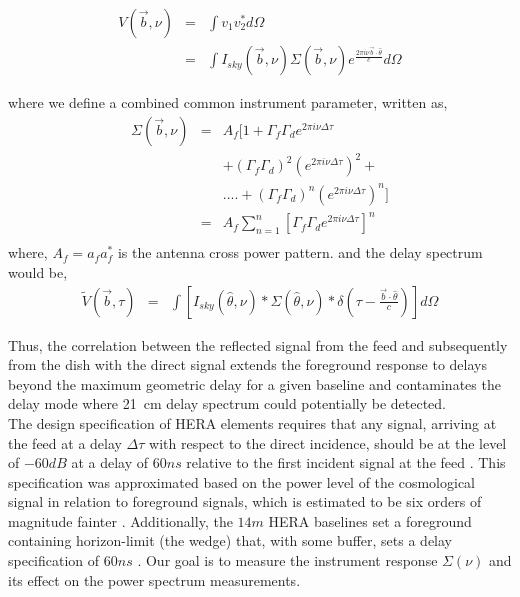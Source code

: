 \documentclass[twocolumn]{emulateapj}
\newcommand{\volt}{{v}}
\newcommand{\vis}{{V}}
\newcommand{\bmvolt}{{a}}
\newcommand{\beam}{{A}}
\newcommand{\thhat}{{\hat\theta}}
\newcommand{\fngexp}{{e^{\frac{2\pi i\nu\vec{b}\cdot\thhat}{c}}}}
\newcommand{\dfngexp}{{e^{2\pi i\nu \Delta \tau}}}
\begin{document}
\begin{eqnarray}\label{eqn:series1}
\vis(\vec b, \nu) & = & \int \volt_{1}\volt_{2}^{*} d\Omega \nonumber\\
			& = & \int I_{sky}(\vec b, \nu)\Sigma(\vec b, \nu) \fngexp d\Omega
\end{eqnarray}

where we define a combined common instrument parameter, written as, 
 \begin{eqnarray}
\Sigma(\vec b, \nu) & = & \beam_{f}  [ 1+  \Gamma_{f}\Gamma_{d} \dfngexp \nonumber\\
&& + (\Gamma_{f}\Gamma_{d})^2(\dfngexp)^{2}+ \nonumber\\
&&  ....+(\Gamma_{f}\Gamma_{d})^{n}(\dfngexp)^{n}  ]\\
& = & \beam_{f}\displaystyle\sum\limits_{n=1}^{n} [\Gamma_{f}\Gamma_{d}\dfngexp]^{n}
   \nonumber\\
   \label{eq6}
\end{eqnarray}
where, $\beam_{f}=\bmvolt_{f}\bmvolt_{f}^{*}$ is the antenna cross power pattern.
and the delay spectrum would be, 
\begin{eqnarray}
\tilde V(\vec b, \tau) & = & \int \left [ I_{sky}(\thhat, \nu) \ast \Sigma(\thhat, \nu) \ast \delta( \tau - \frac{{\vec {b} \cdot \thhat}}{c} )  \right] d\Omega
\label{eq7}
\end{eqnarray}
 
 Thus, the correlation between the reflected signal  from the feed and subsequently from the dish with the direct signal extends the foreground response to delays beyond the maximum geometric delay for a given baseline and contaminates the delay mode where 21~cm delay spectrum could potentially be detected. \\
The design specification of HERA elements requires that any
signal, arriving at the feed at a delay $\Delta \tau$ with respect to the direct incidence, should be
at the level of $-60dB$ at a delay of $60ns$ relative to the first incident
signal at the feed \citep{parsons_deboer_memo}. This specification was
approximated based on the power level of the cosmological signal in relation to
foreground signals, which is estimated to be six orders of magnitude fainter
\citep{santos_et_al2005,ali_et_al2008,deoliveira2008,jelic_et_al2008,bernardi_et_al2009,bernardi_et_al2010,ghosh_et_al2011}. Additionally, the $14m$ HERA baselines set a foreground containing
horizon-limit (the wedge) that, with some buffer, sets a delay specification of
$60ns$
\citep{parsons_et_al2012b,vedantham_et_al2012,nithya_et_al2013,liu_et_al2014a,liu_et_al2014b}. Our goal is to measure the instrument response $\Sigma(\nu)$ and its effect on the power spectrum measurements. 
\end{document}
